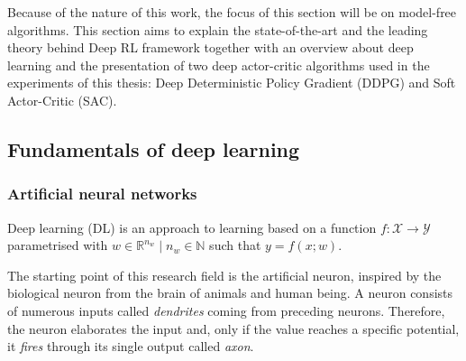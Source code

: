 Because of the nature of this work, the focus of this section will be on model-free algorithms.
This section aims to explain the state-of-the-art and the leading theory behind Deep RL framework together with an overview about deep learning and the presentation of two deep actor-critic algorithms used in the experiments of this thesis: Deep Deterministic Policy Gradient (DDPG) and Soft Actor-Critic (SAC).

\subsection{Fundamentals of deep learning}

\subsubsection{Artificial neural networks}
Deep learning (DL) is an approach to learning based on a function $f: \mathcal{X} \rightarrow \mathcal{Y}$ parametrised with $w \in \mathbb{R}^{n_w}\;|\;n_w \in \mathbb{N}$ such that $y = f(x;w)$.

The starting point of this research field is the artificial neuron, inspired by the biological neuron from the brain of animals and human being.
A neuron consists of numerous inputs called \textit{dendrites} coming from preceding neurons.
Therefore, the neuron elaborates the input and, only if the value reaches a specific potential, it \textit{fires} through its single output called \textit{axon}.

